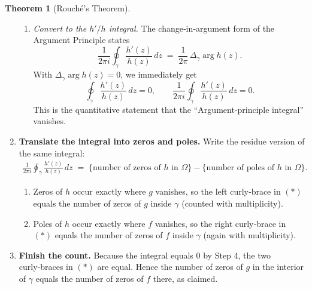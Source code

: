 \documentclass[12pt]{article}
\theoremstyle{definition} %
\newtheorem{theorem}{Theorem}
\theoremstyle{plain} %
\begin{document}
\begin{theorem}[Rouché’s Theorem]
\begin{enumerate}
\begin{enumerate}
                  \item\emph{Convert to the $h'/h$ integral.}  
                        The change‑in‑argument form of the Argument Principle states
                        \[
                            \frac{1}{2\pi i}\oint_{\gamma}\frac{h'(z)}{h(z)}\,dz
                            \;=\;
                            \frac{1}{2\pi}\,\Delta_{\gamma}\arg h(z).
                        \]
                        With $\Delta_{\gamma}\arg h(z)=0$, we immediately get
                        \[
                            \oint_{\gamma}\frac{h'(z)}{h(z)}\,dz=0,
                            \qquad
                            \frac{1}{2\pi i}\oint_{\gamma}\frac{h'(z)}{h(z)}\,dz=0.
                        \]
                        This is the quantitative statement that the “Argument‑principle integral” vanishes.
              \end{enumerate}

        \item\textbf{Translate the integral into zeros and poles.}  
              Write the residue version of the same integral:
              \begin{align}
                  \frac{1}{2\pi i}\oint_{\gamma}\frac{h'(z)}{h(z)}\,dz
                  \;=\;
                  \bigl\{\text{number of zeros of $h$ in $\Omega$}\bigr\}
                  -
                  \bigl\{\text{number of poles of $h$ in $\Omega$}\bigr\}. \tag{$\ast$}
              \end{align}
              \begin{enumerate}
                  \item Zeros of $h$ occur exactly where $g$ vanishes,
                        so the left curly‑brace in $(\ast)$ equals
                        the number of zeros of $g$ inside $\gamma$
                        (counted with multiplicity).
                  \item Poles of $h$ occur exactly where $f$ vanishes,
                        so the right curly‑brace in $(\ast)$ equals
                        the number of zeros of $f$ inside $\gamma$
                        (again with multiplicity).
              \end{enumerate}

        \item\textbf{Finish the count.}  
              Because the integral equals $0$ by Step 4,
              the two curly‑braces in $(\ast)$ are equal.
              Hence the number of zeros of $g$ in the interior of $\gamma$
              equals the number of zeros of $f$ there, as claimed.
    \end{enumerate}
\end{theorem}
\end{document}
